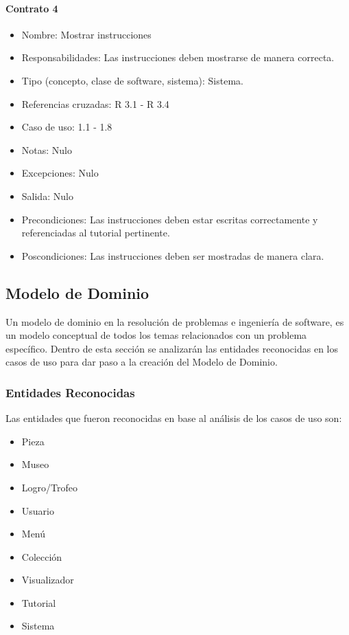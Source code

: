 \paragraph{Contrato 4} 
\begin{itemize}
\item Nombre: Mostrar instrucciones
\item Responsabilidades: Las instrucciones deben mostrarse de manera correcta.
\item Tipo (concepto, clase de software, sistema): Sistema.
\item Referencias cruzadas: R 3.1 - R 3.4
\item Caso de uso: 1.1 - 1.8
\item Notas: Nulo
\item Excepciones: Nulo
\item Salida: Nulo
\item Precondiciones: Las instrucciones deben estar escritas correctamente y referenciadas al tutorial pertinente.
\item Poscondiciones: Las instrucciones deben ser mostradas de manera clara.
\end{itemize}

\subsection{Modelo de Dominio}
Un modelo de dominio en la resolución de problemas e ingeniería de software, es un modelo conceptual de todos los temas relacionados con un problema específico. Dentro de esta sección se analizarán las entidades reconocidas en los casos de uso para dar paso a la creación del Modelo de Dominio.

\subsubsection{Entidades Reconocidas}
Las entidades que fueron reconocidas en base al análisis de los casos de uso son:

\begin{itemize}
\item Pieza
\item Museo
\item Logro/Trofeo
\item Usuario
\item Menú
\item Colección
\item Visualizador
\item Tutorial
\item Sistema
\end{itemize}


